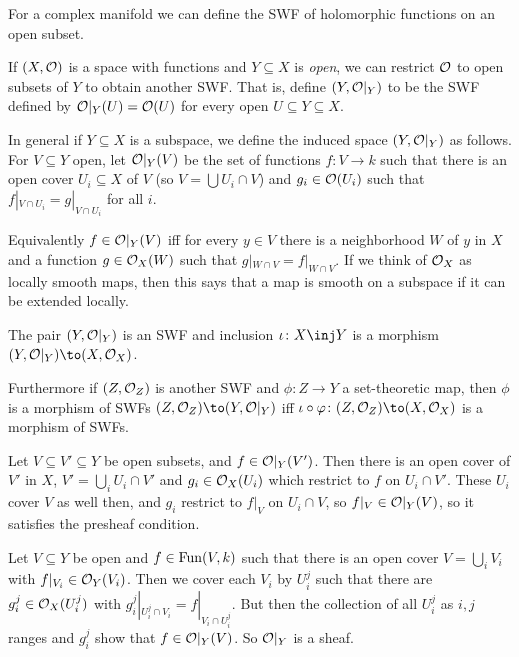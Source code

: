     For a complex manifold we can define the SWF of holomorphic functions on an open subset.

\eexam

\bdefn

    If $(X,{{\cal O}})$ is a space with functions and $Y\subseteq X$ is {\it open}, we can restrict ${{\cal O}}$ to open subsets of $Y$ to obtain another
    SWF.
    That is, define $(Y,{{\cal O}}|_Y)$ to be the SWF defined by ${{\cal O}}|_Y(U)={{\cal O}}(U)$ for every open $U\subseteq Y\subseteq X$.

    In general if $Y\subseteq X$ is a subspace, we define the {\emphcolor induced space} $(Y,{{\cal O}}|_Y)$ as follows.
    For $V\subseteq Y$ open, let ${{\cal O}}|_Y(V)$ be the set of functions $f\colon V\to k$ such that there is an open cover $U_i\subseteq X$ of
    $V$ (so $V=\bigcup U_i\cap V$) and $g_i\in{{\cal O}}(U_i)$ such that $f|_{V\cap U_i}=g|_{V\cap U_i}$ for all $i$.

\edefn

Equivalently $f\in{{\cal O}}|_Y(V)$ iff for every $y\in V$ there is a neighborhood $W$ of $y$ in $X$ and a function $g\in{{\cal O}}_X(W)$ such that
$g|_{W\cap V}=f|_{W\cap V}$.
If we think of ${{\cal O}}_X$ as locally smooth maps, then this says that a map is smooth on a subspace if it can be extended locally.

\bprop

    The pair $(Y,{{\cal O}}|_Y)$ is an SWF and inclusion $\iota\colon X\inj Y$ is a morphism $(Y,\O|_Y)\to(X,\O_X)$.

    Furthermore if $(Z,{{\cal O}}_Z)$ is another SWF and $\phi\colon Z\to Y$ a set-theoretic map, then $\phi$ is a morphism of SWFs
    $(Z,\O_Z)\to(Y,\O|_Y)$ iff $\iota\circ\phi\colon(Z,\O_Z)\to(X,\O_X)$ is a morphism of SWFs.

\eprop

\bproof

    Let $V\subseteq V'\subseteq Y$ be open subsets, and $f\in{{\cal O}}|_Y(V')$.
    Then there is an open cover of $V'$ in $X$, $V'=\bigcup_iU_i\cap V'$ and $g_i\in{{\cal O}}_X(U_i)$ which restrict to $f$ on $U_i\cap V'$.
    These $U_i$ cover $V$ as well then, and $g_i$ restrict to $f|_V$ on $U_i\cap V$, so $f|_V\in{{\cal O}}|_Y(V)$, so it satisfies the presheaf
    condition.

    Let $V\subseteq Y$ be open and $f\in{\rm Fun}(V,k)$ such that there is an open cover $V=\bigcup_iV_i$ with $f|_{V_i}\in{{\cal O}}_Y(V_i)$.
    Then we cover each $V_i$ by $U^j_i$ such that there are $g^j_i\in{{\cal O}}_X(U^j_i)$ with $g^j_i|_{U^j_i\cap V_i}=f|_{V_i\cap U^j_i}$.
    But then the collection of all $U^j_i$ as $i,j$ ranges and $g^j_i$ show that $f\in{{\cal O}}|_Y(V)$.
    So ${{\cal O}}|_Y$ is a sheaf.

